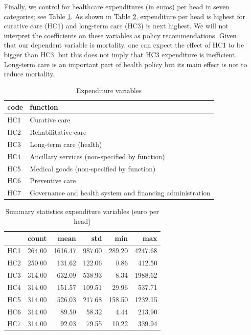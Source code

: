 \documentclass[a4paper,12pt]{article}
\begin{document}
Finally, we control for healthcare expenditures (in euros) per head in seven categories; see Table \ref{tab:expenditure_labels}. As shown in Table \ref{tab:summary_expenditure_variables}, expenditure per head is highest for curative care (HC1) and long-term care (HC3) is next highest. We will not interpret the coefficients on these variables as policy recommendations. Given that our dependent variable is mortality, one can expect the effect of HC1 to be bigger than HC3, but this does not imply that HC3 expenditure is inefficient. Long-term care is an important part of health policy but its main effect is not to reduce mortality.

\begin{table}[htbp]
\caption{\label{tab:expenditure_labels}Expenditure variables}
\centering
\begin{tabular}{ll}
code & function\\
\hline
HC1 & Curative care\\
HC2 & Rehabilitative care\\
HC3 & Long-term care (health)\\
HC4 & Ancillary services (non-specified by function)\\
HC5 & Medical goods (non-specified by function)\\
HC6 & Preventive care\\
HC7 & Governance and health system and financing administration\\
\end{tabular}
\end{table}


\begin{table}[htbp]
\caption{\label{tab:summary_expenditure_variables}Summary statistics expenditure variables (euro per head)}
\centering
\begin{tabular}{lrrrrr}
 & count & mean & std & min & max\\
\hline
HC1 & 264.00 & 1616.47 & 987.00 & 289.20 & 4247.68\\
HC2 & 250.00 & 131.62 & 122.06 & 0.86 & 412.50\\
HC3 & 314.00 & 632.09 & 538.93 & 8.34 & 1988.62\\
HC4 & 314.00 & 151.57 & 109.51 & 29.96 & 537.71\\
HC5 & 314.00 & 526.03 & 217.68 & 158.50 & 1232.15\\
HC6 & 314.00 & 89.50 & 58.32 & 4.44 & 213.90\\
HC7 & 314.00 & 92.03 & 79.55 & 10.22 & 339.94\\
\end{tabular}
\end{table}
\end{document}
